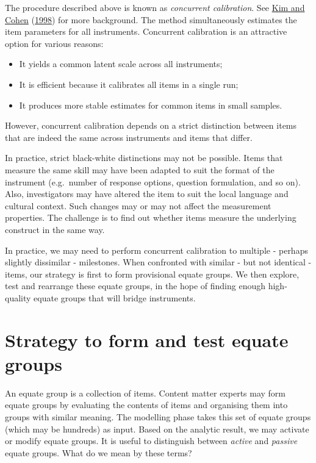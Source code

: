 \documentclass[
]{book}
\providecommand{\tightlist}{%
  \setlength{\itemsep}{0pt}\setlength{\parskip}{0pt}}
\begin{document}
The procedure described above is known as \emph{concurrent calibration}. See \protect\hyperlink{ref-kim1998}{Kim and Cohen} (\protect\hyperlink{ref-kim1998}{1998}) for more background. The method simultaneously estimates the item parameters for all instruments. Concurrent calibration is an attractive option for various reasons:

\begin{itemize}
\tightlist
\item
  It yields a common latent scale across all instruments;
\item
  It is efficient because it calibrates all items in a single run;
\item
  It produces more stable estimates for common items in small samples.
\end{itemize}

However, concurrent calibration depends on a strict distinction between items that are indeed the same across instruments and items that differ.

In practice, strict black-white distinctions may not be possible. Items that measure the same skill may have been adapted to suit the format of the instrument (e.g.~number of response options, question formulation, and so on). Also, investigators may have altered the item to suit the local language and cultural context. Such changes may or may not affect the measurement properties. The challenge is to find out whether items measure the underlying construct in the same way.

In practice, we may need to perform concurrent calibration to multiple - perhaps slightly dissimilar - milestones. When confronted with similar - but not identical - items, our strategy is first to form provisional equate groups. We then explore, test and rearrange these equate groups, in the hope of finding enough high-quality equate groups that will bridge instruments.

\hypertarget{sec:equaterules}{%
\section{Strategy to form and test equate groups}\label{sec:equaterules}}

An equate group is a collection of items. Content matter experts may form equate groups by evaluating the contents of items and organising them into groups with similar meaning. The modelling phase takes this set of equate groups (which may be hundreds) as input. Based on the analytic result, we may activate or modify equate groups. It is useful to distinguish between \emph{active} and \emph{passive} equate groups. What do we mean by these terms?
\end{document}
